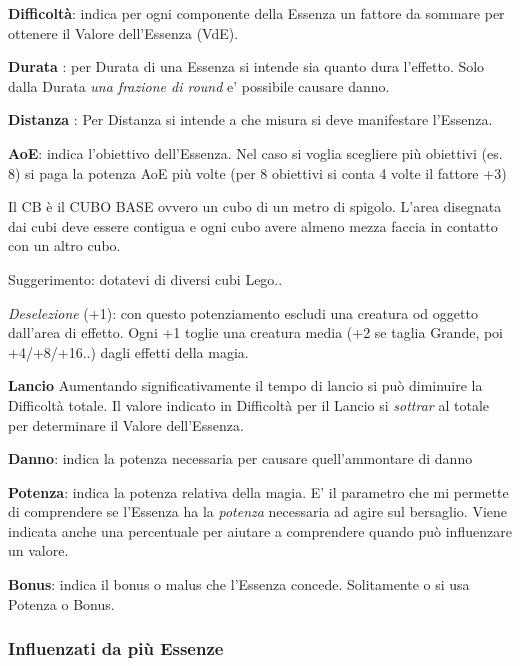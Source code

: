 \documentclass[a4paper,twoside,openany]{book}
\begin{document}
\begin{multicols}{2}

\textbf{Difficoltà}: indica per ogni componente della Essenza un fattore da sommare per ottenere il Valore dell'Essenza (VdE).

\textbf{Durata} : per Durata di una Essenza si intende sia quanto dura l'effetto.
Solo dalla Durata \emph{una frazione di round} e' possibile causare danno.

\textbf{Distanza} : Per Distanza si intende a che misura si deve manifestare l'Essenza.

\textbf{AoE}: indica l'obiettivo dell'Essenza. Nel caso si voglia scegliere più obiettivi (es. 8) si paga la potenza AoE più volte (per 8 obiettivi si conta 4 volte il fattore +3)

Il CB è il CUBO BASE ovvero un cubo di un metro di spigolo. L'area disegnata dai cubi deve essere contigua e ogni cubo avere almeno mezza faccia in contatto con un altro cubo.

Suggerimento: dotatevi di diversi cubi Lego..

\textit{Deselezione} (+1): con questo potenziamento escludi una creatura od oggetto dall'area di effetto. Ogni +1 toglie una creatura media (+2 se taglia Grande, poi +4/+8/+16..) dagli effetti della magia.

\textbf{Lancio}  
Aumentando significativamente il tempo di lancio  si può diminuire la Difficoltà totale. Il valore indicato in Difficoltà per il Lancio si \emph{sottrar} al totale per determinare il Valore dell'Essenza.

\textbf{Danno}: indica la potenza necessaria per causare quell'ammontare di danno

\textbf{Potenza}: indica la potenza relativa della magia. E' il parametro che mi permette di comprendere se l'Essenza ha la \emph{potenza} necessaria ad agire sul bersaglio. Viene indicata anche una percentuale per aiutare a comprendere quando può influenzare un valore.

\textbf{Bonus}: indica il bonus o malus che l'Essenza concede. Solitamente o si usa Potenza o Bonus.

\subsubsection{Influenzati da più Essenze}


\end{multicols}
\end{document}
